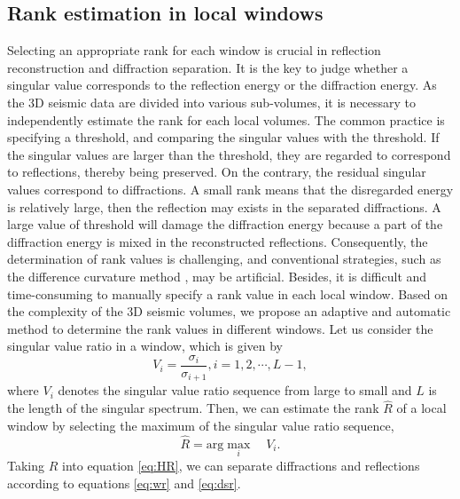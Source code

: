 \subsection{Rank estimation in local windows}
Selecting an appropriate rank for each window is crucial in reflection reconstruction and diffraction separation. 
It is the key to judge whether a singular value corresponds to the reflection energy or the diffraction energy.
As the 3D seismic data are divided into various sub-volumes, it is necessary to independently estimate the rank for each local volumes. 
The common practice is specifying a threshold, and comparing the singular values with the threshold. 
If the singular values are larger than the threshold, they are regarded to correspond to reflections, thereby being preserved.
On the contrary, the residual singular values correspond to diffractions.
A small rank means that the disregarded energy is relatively large, then the reflection may exists in the separated diffractions.
A large value of threshold will damage the diffraction energy because a part of the diffraction energy is mixed in the  reconstructed reflections.
Consequently,  the determination of rank values is challenging, and conventional strategies, such as  the difference curvature method \cite[]{Vicente2011Simultaneous}, may be artificial. 
Besides, it is difficult and time-consuming to manually specify a rank value in each local window.
Based on the complexity of the 3D seismic volumes, we propose an adaptive and automatic method to determine the rank values in different windows.
Let us consider the singular value ratio in a window, which is given by
\begin{equation} \label{eq:svr}
V_i=\dfrac{\sigma_i}{\sigma_{i+1}},i=1,2,\cdots,L-1,
\end{equation}
where $V_i$ denotes the singular value ratio sequence from large to small and $L$ is the length of the singular spectrum. Then, we can estimate the rank $\hat{R}$ of a local window by selecting the maximum of  the singular value ratio sequence, 
\begin{equation} \label{eq:svr}
\hat{R}=\text{arg} \max\limits_i\quad V_i.
\end{equation}
Taking $\hat{R}$ into equation \ref{eq:HR}, we can separate diffractions and reflections according to equations \ref{eq:wr} and \ref{eq:dsr}. 

